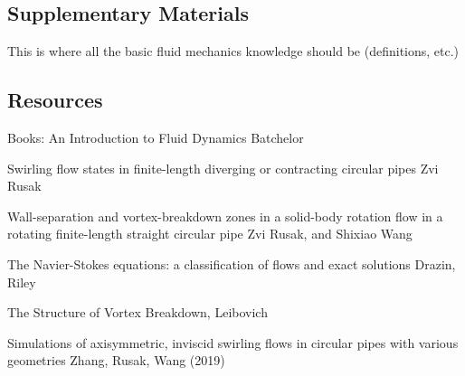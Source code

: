 \documentclass{X:/Documents/Coding/Latex/myreport}
\begin{document}
\subsection{Supplementary Materials}
This is where all the basic fluid mechanics knowledge should be (definitions, etc.)

\subsection{Resources}
Books:
An Introduction to Fluid Dynamics
Batchelor

Swirling flow states in finite-length diverging or contracting circular pipes
Zvi Rusak


Wall-separation and vortex-breakdown zones in a solid-body rotation flow in a rotating finite-length straight circular pipe
Zvi Rusak, and Shixiao Wang

The Navier-Stokes equations: a classification of flows and exact solutions
Drazin, Riley


The Structure of Vortex Breakdown, 
Leibovich



Simulations of axisymmetric, inviscid swirling flows in circular pipes with various geometries
Zhang, Rusak, Wang (2019)
\end{document}
